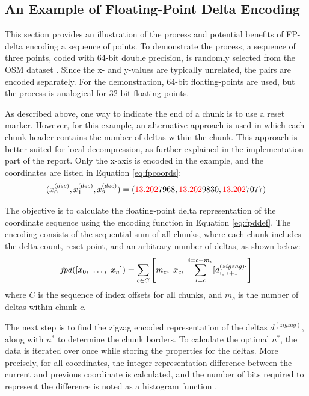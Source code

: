 \subsection{An Example of Floating-Point Delta Encoding}
This section provides an illustration of the process and potential benefits of FP-delta encoding a sequence of points. To demonstrate the process, a sequence of three points, coded with 64-bit double precision, is randomly selected from the OSM dataset \cite{osmabout}. Since the x- and y-values are typically unrelated, the pairs are encoded separately. For the demonstration, 64-bit floating-points are used, but the process is analogical for 32-bit floating-points.

As described above, one way to indicate the end of a chunk is to use a reset marker. However, for this example, an alternative approach is used in which each chunk header contains the number of deltas within the chunk. This approach is better suited for local decompression, as further explained in the implementation part of the report. Only the x-axis is encoded in the example, and the coordinates are 
listed in Equation \ref{eq:fpcoords}:
\begin{equation}
(x_0^{(dec)}, x_1^{(dec)}, x_2^{(dec)}) = (\textcolor{red}{13.202}\textcolor{black}{7968}, \textcolor{red}{13.202}\textcolor{black}{9830}, \textcolor{red}{13.202}\textcolor{black}{7077})
\label{eq:fpcoords}
\end{equation}

The objective is to calculate the floating-point delta representation of the coordinate sequence using the encoding function in Equation \ref{eq:fpddef}. The encoding consists of the sequential sum of all chunks, where each chunk includes the delta count, reset point, and an arbitrary number of deltas, as shown below:
\begin{equation}
    f\hspace{-0.15em}pd([x_0,\ \ldots,\ x_n]) = \sum_{c \in C} \left[m_c,\ x_c,\ \sum_{i=c}^{i = c + m_c} [d_{i,\ i+1}^{(zigzag)}] \right]
\label{eq:fpddef}
\end{equation}
where $C$ is the sequence of index offsets for all chunks, and $m_c$ is the number of deltas within chunk $c$.

The next step is to find the zigzag encoded representation of the deltas $d^{(zigzag)}$, along with $n^*$ to determine the chunk borders. To calculate the optimal \(n^*\), the data is iterated over once while storing the properties for the deltas. More precisely, for all coordinates, the integer representation difference between the current and previous coordinate is calculated, and the number of bits required to represent the difference is noted as a histogram function \cite{spatialparquet}.

